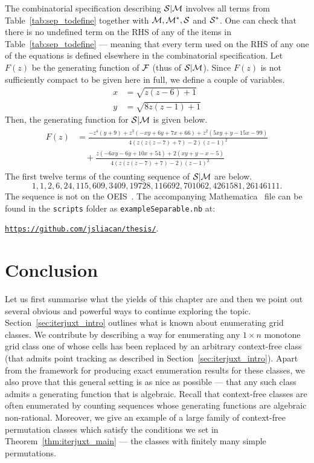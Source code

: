\documentclass[12pt, a4paper, twoside]{report}
\begin{document}
The combinatorial specification describing $\mathcal{S}|\mathcal{M}$ involves all terms from Table~\ref{tab:sep_todefine} together with $\mathcal{M}, \mathcal{M}^*, \mathcal{S}$ and $\mathcal{S}^*$. One can check that there is no undefined term on the RHS of any of the items in Table~\ref{tab:sep_todefine} --- meaning that every term used on the RHS of any one of the equations is defined elsewhere in the combinatorial specification. Let $F(z)$ be the generating function of $\mathcal{F}$ (thus of $\mathcal{S}|\mathcal{M}$). Since $F(z)$ is not sufficiently compact to be given here in full, we define a couple of variables.
\begin{align*}
  x &= \sqrt{z(z-6)+1}\\
  y &= \sqrt{8z(z-1)+1}
\end{align*}
Then, the generating function for $\mathcal{S}|\mathcal{M}$ is given below.
\begin{align}
  \begin{aligned}
  F(z) &= \frac{-z^4(y+9)+z^3(-xy+6y+7x+66)+z^2(5xy+y-15x-99)}{4(z(z(z-7)+7)-2)(z-1)^2}\\
       &\quad+ \frac{z(-6xy-6y+10x+54)+2(xy+y-x-5)}{4(z(z(z-7)+7)-2)(z-1)^2}
         \end{aligned}
\end{align}
The first twelve terms of the counting sequence of $\mathcal{S}|\mathcal{M}$ are below.
$$1,1,2,6,24,115,609,3409, 19728, 116692, 701062, 4261581, 26146111.$$
The sequence is not on the OEIS~\cite{oeis}. The accompanying Mathematica~\cite{mathematica} file can be found in the \texttt{scripts} folder as \texttt{exampleSeparable.nb} at:

\begin{center}\href{https://github.com/jsliacan/thesis}{\texttt{https://github.com/jsliacan/thesis/}}.\end{center}


\section{Conclusion}
\label{sec:iterjuxt_conclusion}
Let us first summarise what the yields of this chapter are and then we point out several obvious and powerful ways to continue exploring the topic. Section~\ref{sec:iterjuxt_intro} outlines what is known about enumerating grid classes. We contribute by describing a way for enumerating any $1\times n$ monotone grid class one of whose cells has been replaced by an arbitrary context-free class (that admits point tracking as described in Section~\ref{sec:iterjuxt_intro}). Apart from the framework for producing exact enumeration results for these classes, we also prove that this general setting is as nice as possible --- that any such class admits a generating function that is algebraic. Recall that context-free classes are often enumerated by counting sequences whose generating functions are algebraic non-rational. Moreover, we give an example of a large family of context-free permutation classes which satisfy the conditions we set in Theorem~\ref{thm:iterjuxt_main} --- the classes with finitely many simple permutations.
\end{document}
